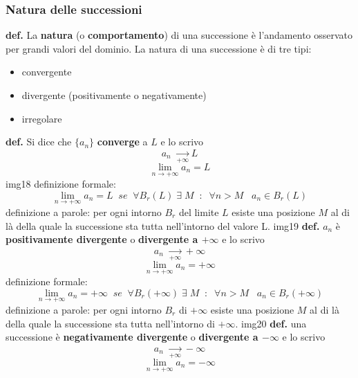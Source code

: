 \subsubsection*{Natura delle successioni}
\textbf{def.} La \textbf{natura} (o \textbf{comportamento}) di una successione è l'andamento osservato per grandi valori del dominio.
\newline
La natura di una successione è di tre tipi:
\begin{itemize}
    \item convergente
    \item divergente (positivamente o negativamente)
    \item irregolare
\end{itemize}
\textbf{def.} Si dice che $\{a_n\}$ \textbf{converge} a $L$ e lo scrivo
\[
    a_n \; \xrightarrow[+ \infty] \; L
\]
\[
    \lim_{n\rightarrow + \infty} a_n = L
\]
img18
\newline
definizione formale:
\[
    \lim_{n\rightarrow + \infty} a_n = L \;\;se\;\; \forall B_r(L) \;\exists \; M \;\;:\;\; \forall n>M \;\;\; a_n \in B_r(L)
\]
definizione a parole:
\newline
per ogni intorno $B_r$ del limite $L$ esiste una posizione $M$ al di là della quale la successione sta tutta nell'intorno del valore L.
\newline
img19
\newline
\newline
\newline
\textbf{def.} $a_n$ è \textbf{positivamente divergente} o \textbf{divergente a $+\infty$} e lo scrivo
\[
    a_n \; \xrightarrow[+ \infty] \; + \infty
\]
\[
    \lim_{n\rightarrow +\infty} a_n = + \infty
\]
\newline
definizione formale:
\[
    \lim_{n\rightarrow + \infty} a_n = +\infty \;\;se\;\; \forall B_r(+\infty) \;\exists \; M \;\;:\;\; \forall n>M \;\;\; a_n \in B_r(+\infty)
\]
definizione a parole:
\newline
per ogni intorno $B_r$ di $+\infty$ esiste una posizione $M$ al di là della quale la successione sta tutta nell'intorno di $+\infty$.
\newline
img20
\newline
\newline
\newline
\textbf{def.} una successione è \textbf{negativamente divergente} o \textbf{divergente a $-\infty$} e lo scrivo
\[
    a_n \; \xrightarrow[+ \infty] \; - \infty
\]
\[
    \lim_{n\rightarrow +\infty} a_n = - \infty
\]
\newline
